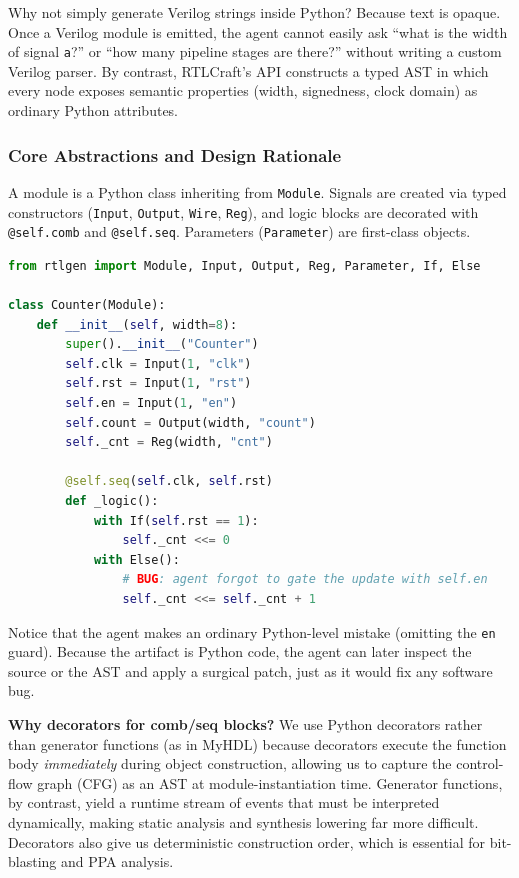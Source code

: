 \documentclass[11pt]{article}
\begin{document}
Why not simply generate Verilog strings inside Python? Because text is opaque. Once a Verilog module is emitted, the agent cannot easily ask ``what is the width of signal \texttt{a}?'' or ``how many pipeline stages are there?'' without writing a custom Verilog parser. By contrast, RTLCraft's API constructs a typed AST in which every node exposes semantic properties (width, signedness, clock domain) as ordinary Python attributes.

\subsubsection{Core Abstractions and Design Rationale}

A module is a Python class inheriting from \texttt{Module}. Signals are created via typed constructors (\texttt{Input}, \texttt{Output}, \texttt{Wire}, \texttt{Reg}), and logic blocks are decorated with \texttt{@self.comb} and \texttt{@self.seq}. Parameters (\texttt{Parameter}) are first-class objects.

\begin{lstlisting}[language=Python, caption={Initial agent-generated Counter (contains a bug)}, label={lst:counter_buggy}]
from rtlgen import Module, Input, Output, Reg, Parameter, If, Else

class Counter(Module):
    def __init__(self, width=8):
        super().__init__("Counter")
        self.clk = Input(1, "clk")
        self.rst = Input(1, "rst")
        self.en = Input(1, "en")
        self.count = Output(width, "count")
        self._cnt = Reg(width, "cnt")

        @self.seq(self.clk, self.rst)
        def _logic():
            with If(self.rst == 1):
                self._cnt <<= 0
            with Else():
                # BUG: agent forgot to gate the update with self.en
                self._cnt <<= self._cnt + 1
\end{lstlisting}

Notice that the agent makes an ordinary Python-level mistake (omitting the \texttt{en} guard). Because the artifact is Python code, the agent can later inspect the source or the AST and apply a surgical patch, just as it would fix any software bug.

\textbf{Why decorators for comb/seq blocks?} We use Python decorators rather than generator functions (as in MyHDL) because decorators execute the function body \textit{immediately} during object construction, allowing us to capture the control-flow graph (CFG) as an AST at module-instantiation time. Generator functions, by contrast, yield a runtime stream of events that must be interpreted dynamically, making static analysis and synthesis lowering far more difficult. Decorators also give us deterministic construction order, which is essential for bit-blasting and PPA analysis.
\end{document}
